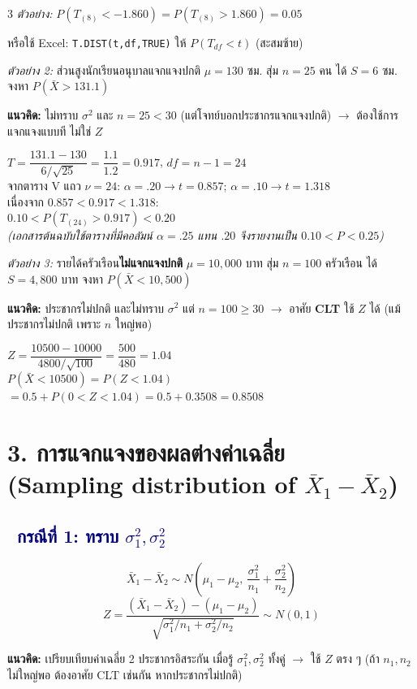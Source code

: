 \documentclass[9pt]{extarticle}
\newcommand{\dist}[1]{\subsection*{\textcolor{navy}{\textbullet\ #1}}}
\begin{document}
\begin{multicols}{3}
\textit{ตัวอย่าง:} $P(T_{(8)}<-1.860)=P(T_{(8)}>1.860)=0.05$

หรือใช้ Excel: \texttt{T.DIST}\allowbreak\texttt{(t,df,TRUE)} ให้ $P(T_{df}{<}t)$ (สะสมซ้าย)

\columnbreak
\textit{ตัวอย่าง 2:} ส่วนสูงนักเรียนอนุบาลแจกแจงปกติ $\mu{=}130$ ซม. สุ่ม $n{=}25$ คน ได้ $S{=}6$ ซม. จงหา $P(\bar X{>}131.1)$
\begin{ideabox}
\textbf{แนวคิด:} ไม่ทราบ $\sigma^2$ และ $n{=}25{<}30$ (แต่โจทย์บอกประชากร\allowbreak แจกแจงปกติ) $\to$ ต้องใช้การแจกแจง\allowbreak แบบที ไม่ใช่ $Z$
\end{ideabox}
\begin{solbox}
$T=\dfrac{131.1-130}{6/\sqrt{25}}=\dfrac{1.1}{1.2}=0.917$, $df{=}n{-}1{=}24$\\
จากตาราง V แถว $\nu{=}24$: $\alpha{=}.20\to t{=}0.857$; $\alpha{=}.10\to t{=}1.318$\\
เนื่องจาก $0.857<0.917<1.318$:\\
$0.10<P(T_{(24)}{>}0.917)<0.20$\\
\textit{(เอกสารต้นฉบับใช้ตารางที่มีคอลัมน์ $\alpha{=}.25$ แทน $.20$ จึงรายงานเป็น $0.10{<}P{<}0.25$)}
\end{solbox}

\textit{ตัวอย่าง 3:} รายได้ครัวเรือน\textbf{ไม่แจกแจงปกติ} $\mu{=}10{,}000$ บาท สุ่ม $n{=}100$ ครัวเรือน ได้ $S{=}4{,}800$ บาท จงหา $P(\bar X{<}10{,}500)$
\begin{ideabox}
\textbf{แนวคิด:} ประชากรไม่ปกติ และไม่ทราบ $\sigma^2$ แต่ $n{=}100\ge30$ $\to$ อาศัย \textbf{CLT} ใช้ $Z$ ได้ (แม้ประชากรไม่ปกติ เพราะ $n$ ใหญ่พอ)
\end{ideabox}
\begin{solbox}
$Z=\dfrac{10500-10000}{4800/\sqrt{100}}=\dfrac{500}{480}=1.04$\\
$P(\bar X{<}10500)=P(Z{<}1.04)$\\
$=0.5+P(0{<}Z{<}1.04)=0.5+0.3508=0.8508$
\end{solbox}

\section*{3. การแจกแจงของผลต่างค่าเฉลี่ย\\(Sampling distribution of $\bar X_1-\bar X_2$)}

\dist{กรณีที่ 1: ทราบ $\sigma_1^2,\sigma_2^2$}
\begin{formulabox}
$$\bar X_1-\bar X_2 \sim N\!\left(\mu_1-\mu_2,\ \dfrac{\sigma_1^2}{n_1}+\dfrac{\sigma_2^2}{n_2}\right)$$
$$Z=\dfrac{(\bar X_1-\bar X_2)-(\mu_1-\mu_2)}{\sqrt{\sigma_1^2/n_1+\sigma_2^2/n_2}}\sim N(0,1)$$
\end{formulabox}
\begin{ideabox}
\textbf{แนวคิด:} เปรียบเทียบค่าเฉลี่ย 2 ประชากร\allowbreak อิสระกัน เมื่อรู้ $\sigma_1^2,\sigma_2^2$ ทั้งคู่ $\to$ ใช้ $Z$ ตรง ๆ (ถ้า $n_1,n_2$ ไม่ใหญ่พอ ต้องอาศัย CLT เช่นกัน หากประชากรไม่ปกติ)
\end{ideabox}


\end{multicols}
\end{document}

